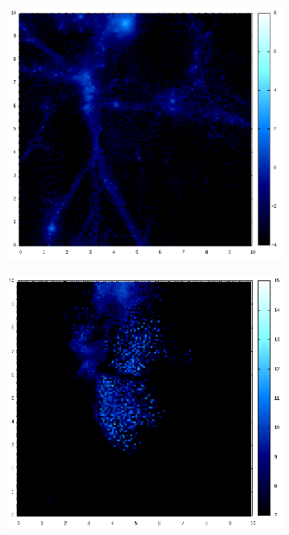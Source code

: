 \documentclass[journal]{IEEEtran}
\begin{document}
\begin{figure}[htb]
\begin{subfigure}[t]{0.25\textwidth}
	\end{subfigure}
	\quad
	\begin{subfigure}[t]{0.25\textwidth}
		\centering
		\includegraphics[width=\linewidth]{GAS08-09.png}
	\end{subfigure}
	\quad
	\begin{subfigure}[t]{0.25\textwidth}
		\centering
		\includegraphics[width=\linewidth]{TEMP08-09.png}

\end{subfigure}
\end{figure}
\end{document}
